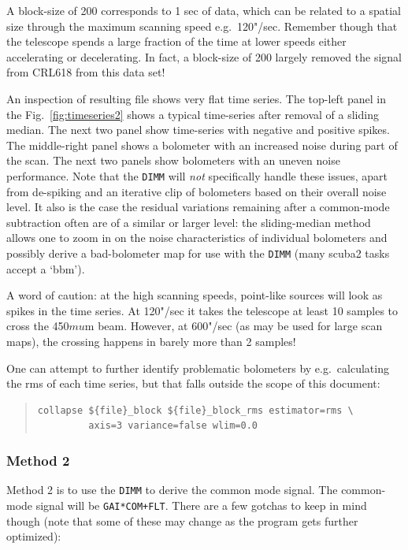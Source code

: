 \documentclass[twoside,11pt]{article}
\newcommand{\xlabel}[1]{}
\renewcommand{\_}{\texttt{\symbol{95}}}
\newenvironment{myquote}{\begin{quote}\begin{small}}{\end{small}\end{quote}}
\begin{document}
A block-size of 200 corresponds to 1 sec of data, which can be related
to a spatial size through the maximum scanning speed
e.g.\ 120"/sec. Remember though that the telescope spends a large
fraction of the time at lower speeds either accelerating or
decelerating. In fact, a block-size of 200 largely removed the signal
from CRL618 from this data set!

An inspection of resulting file shows very flat time series. The
top-left panel in the Fig.~\ref{fig:timeseries2} shows a typical
time-series after removal of a sliding median. The next two panel show
time-series with negative and positive spikes. The middle-right panel
shows a bolometer with an increased noise during part of the scan. The
next two panels show bolometers with an uneven noise performance. Note
that the \texttt{DIMM} will {\sl not} specifically handle these
issues, apart from de-spiking and an iterative clip of bolometers
based on their overall noise level.  It also is the case the residual
variations remaining after a common-mode subtraction often are of a
similar or larger level: the sliding-median method allows one to zoom
in on the noise characteristics of individual bolometers and possibly
derive a bad-bolometer map for use with the \texttt{DIMM} (many scuba2
tasks accept a `bbm').

A word of caution: at the high scanning speeds, point-like sources
will look as spikes in the time series. At 120"/sec it takes the
telescope at least 10 samples to cross the 450${mu}$m beam. However, at
600"/sec (as may be used for large scan maps), the crossing happens in
barely more than 2 samples!

One can attempt to further identify problematic bolometers by
e.g.\ calculating the rms of each time series, but that falls outside
the scope of this document:

\begin{myquote}
\begin{verbatim}
collapse ${file}_block ${file}_block_rms estimator=rms \
         axis=3 variance=false wlim=0.0
\end{verbatim}
\end{myquote}

\subsubsection{\xlabel{method2}Method 2}
\label{sec:method2}

Method 2 is to use the \texttt{DIMM} to derive the common mode signal. The
common-mode signal will be \texttt{GAI*COM+FLT}. There are a few gotchas to
keep in mind though (note that some of these may change as the program
gets further optimized):
\end{document}
